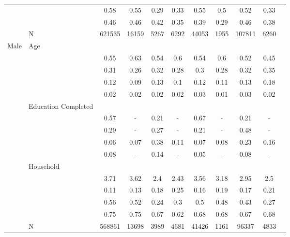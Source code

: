 \begin{table}[ht]
\begin{tabular}{l>{\raggedright\arraybackslash}p{3.2cm}|ccccccccc}
   & \multicolumn{1}{>{\raggedleft\arraybackslash}p{2.9cm}|}{\makebox[2.9cm][r]{Lives with Child }} & 0.58 & 0.55 & 0.29 & 0.33 & 0.55 & 0.5 & 0.52 & 0.33 \\ 
   & \multicolumn{1}{>{\raggedleft\arraybackslash}p{3.4cm}|}{\makebox[3.4cm][r]{Married/Cohabiting }} & 0.46 & 0.46 & 0.42 & 0.35 & 0.39 & 0.29 & 0.46 & 0.38 \\ 
   & N & 621535 & 16159 & 5267 & 6292 & 44053 & 1955 & 107811 & 6260 \\ 
  Male & Age &  &  &  &  &  &  &  &  \\ 
   & \multicolumn{1}{>{\raggedleft\arraybackslash}p{1.5cm}|}{\makebox[1.5cm][r]{60 - 69 }} & 0.55 & 0.63 & 0.54 & 0.6 & 0.54 & 0.6 & 0.52 & 0.45 \\ 
   & \multicolumn{1}{>{\raggedleft\arraybackslash}p{1.5cm}|}{\makebox[1.5cm][r]{70 - 79 }} & 0.31 & 0.26 & 0.32 & 0.28 & 0.3 & 0.28 & 0.32 & 0.35 \\ 
   & \multicolumn{1}{>{\raggedleft\arraybackslash}p{1.5cm}|}{\makebox[1.5cm][r]{80 - 89 }} & 0.12 & 0.09 & 0.13 & 0.1 & 0.12 & 0.11 & 0.13 & 0.18 \\ 
   & \multicolumn{1}{>{\raggedleft\arraybackslash}p{1.5cm}|}{\makebox[1.5cm][r]{90 plus }} & 0.02 & 0.02 & 0.02 & 0.02 & 0.03 & 0.01 & 0.03 & 0.02 \\ 
   & Education Completed &  &  &  &  &  &  &  &  \\ 
   & \multicolumn{1}{>{\raggedleft\arraybackslash}p{3.2cm}|}{\makebox[3.2cm][r]{Less than Primary }} & 0.57 & - & 0.21 & - & 0.67 & - & 0.21 & - \\ 
   & \multicolumn{1}{>{\raggedleft\arraybackslash}p{1.7cm}|}{\makebox[1.7cm][r]{Primary }} & 0.29 & - & 0.27 & - & 0.21 & - & 0.48 & - \\ 
   & \multicolumn{1}{>{\raggedleft\arraybackslash}p{2cm}|}{\makebox[2cm][r]{Secondary }} & 0.06 & 0.07 & 0.38 & 0.11 & 0.07 & 0.08 & 0.23 & 0.16 \\ 
   & \multicolumn{1}{>{\raggedleft\arraybackslash}p{2cm}|}{\makebox[2cm][r]{University }} & 0.08 & - & 0.14 & - & 0.05 & - & 0.08 & - \\ 
   & Household &  &  &  &  &  &  &  &  \\ 
   & \multicolumn{1}{>{\raggedleft\arraybackslash}p{2.7cm}|}{\makebox[2.7cm][r]{Household Size }} & 3.71 & 3.62 & 2.4 & 2.43 & 3.56 & 3.18 & 2.95 & 2.5 \\ 
   & \multicolumn{1}{>{\raggedleft\arraybackslash}p{2.2cm}|}{\makebox[2.2cm][r]{Lives Alone }} & 0.11 & 0.13 & 0.18 & 0.25 & 0.16 & 0.19 & 0.17 & 0.21 \\ 
   & \multicolumn{1}{>{\raggedleft\arraybackslash}p{2.9cm}|}{\makebox[2.9cm][r]{Lives with Child }} & 0.56 & 0.52 & 0.24 & 0.3 & 0.5 & 0.48 & 0.43 & 0.27 \\ 
   & \multicolumn{1}{>{\raggedleft\arraybackslash}p{3.4cm}|}{\makebox[3.4cm][r]{Married/Cohabiting }} & 0.75 & 0.75 & 0.67 & 0.62 & 0.68 & 0.68 & 0.67 & 0.68 \\ 
   & N & 568861 & 13698 & 3989 & 4681 & 41426 & 1161 & 96337 & 4833 \\ 
   \hline
\end{tabular}
\endgroup
\end{table}
